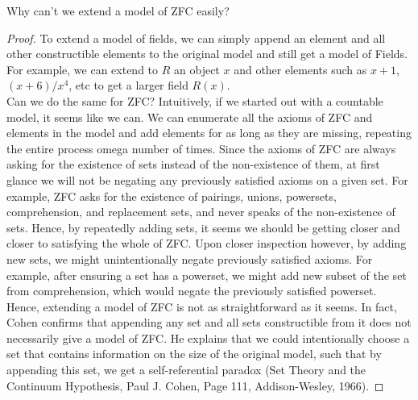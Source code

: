 \begin{question}
  Why can't we extend a model of ZFC easily?
\end{question}
\begin{proof}
  To extend a model of fields, we can simply append an element and all other
  constructible elements to the original model and still get a model of
  Fields. For example, we can extend to $R$ an object $x$ and other
  elements such as $x+1$, $(x+6)/x^4$, etc to get a larger field $R(x)$.\\

  Can we do the same for ZFC? Intuitively, if we started out with a countable
  model, it seems like we can. We can enumerate all the axioms of ZFC and
  elements in the model and add elements for as long as they are missing,
  repeating the entire process omega number of times. Since the axioms of ZFC
  are always asking for the existence of sets instead of the non-existence of
  them, at first glance we will not be negating any previously satisfied
  axioms on a given set. For example, ZFC asks for the existence of pairings,
  unions, powersets, comprehension, and replacement sets, and never speaks of
  the non-existence of sets. Hence, by repeatedly adding sets, it seems we
  should be getting closer and closer to satisfying the whole of ZFC. Upon
  closer inspection however, by adding new sets, we might unintentionally
  negate previously satisfied axioms. For example, after ensuring a set has a
  powerset, we might add new subset of the set from comprehension, which
  would negate the previously satisfied powerset.\\

  Hence, extending a model of ZFC is not as straightforward as it seems. In
  fact, Cohen confirms that appending any set and all sets constructible from
  it does not necessarily give a model of ZFC. He explains that we could
  intentionally choose a set that contains information on the size of the
  original model, such that by appending this set, we get a self-referential
  paradox (Set Theory and the Continuum Hypothesis, Paul J. Cohen, Page 111,
  Addison-Wesley, 1966).
\end{proof}
